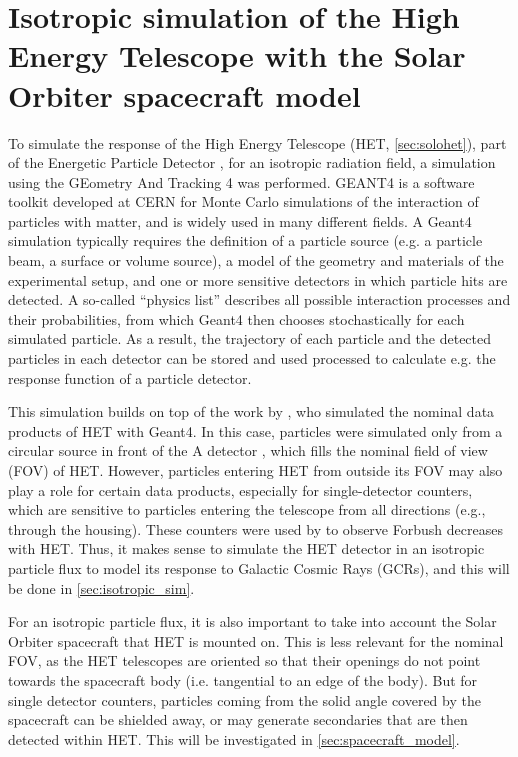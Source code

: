\chapter{Isotropic simulation of the High Energy Telescope with the Solar Orbiter spacecraft model}
\label{chp:HETSimulation}

To simulate the response of the High Energy Telescope (HET, \autoref{sec:solohet}), part of the Energetic Particle Detector \citep[EPD][]{RodriguezPacheco-2019-EPD}, for an isotropic radiation field, a simulation using the GEometry And Tracking 4 \citep[Geant4][]{Agostinelli-2003} was performed. GEANT4 is a software toolkit developed at CERN for Monte Carlo simulations of the interaction of particles with matter, and is widely used in many different fields. A Geant4 simulation typically requires the definition of a particle source (e.g. a particle beam, a surface or volume source), a model of the geometry and materials of the experimental setup, and one or more sensitive detectors in which particle hits are detected. A so-called ``physics list'' describes all possible interaction processes and their probabilities, from which Geant4 then chooses stochastically for each simulated particle. As a result, the trajectory of each particle and the detected particles in each detector can be stored and used processed to calculate e.g. the response function of a particle detector.

This simulation builds on top of the work by \citet{Elftmann-2020-PhD}, who simulated the nominal data products of HET with Geant4. In this case, particles were simulated only from a circular source in front of the A detector \citet[Figure 5.1]{Elftmann-2020-PhD}, which fills the nominal field of view (FOV) of HET. However, particles entering HET from outside its FOV may also play a role for certain data products, especially for single-detector counters, which are sensitive to particles entering the telescope from all directions (e.g., through the housing). These counters were used by \citet{Forstner-2021-SolO} to observe Forbush decreases with HET. Thus, it makes sense to simulate the HET detector in an isotropic particle flux to model its response to Galactic Cosmic Rays (GCRs), and this will be done in \autoref{sec:isotropic_sim}.

For an isotropic particle flux, it is also important to take into account the Solar Orbiter spacecraft that HET is mounted on. This is less relevant for the nominal FOV, as the HET telescopes are oriented so that their openings do not point towards the spacecraft body (i.e. tangential to an edge of the body). But for single detector counters, particles coming from the solid angle covered by the spacecraft can be shielded away, or may generate secondaries that are then detected within HET. This will be investigated in \autoref{sec:spacecraft_model}.

